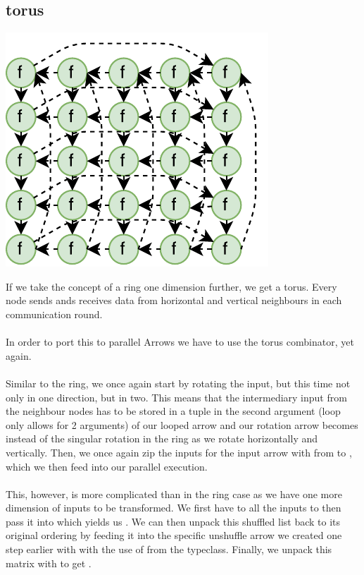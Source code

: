 \subsection{torus}
\begin{center}
	\includegraphics[scale=0.75]{images/torus}
\end{center}
If we take the concept of a ring one dimension further, we get a torus. Every node sends ands receives data from horizontal and vertical neighbours in each communication round.
\\\\
In order to port this to parallel Arrows we have to use the torus combinator, yet again.
\\\\
Similar to the ring, we once again start by rotating the input, but this time not only in one direction, but in two. This means that the intermediary input from the neighbour nodes has to be stored in a tuple \code{([[fut a]], [[fut b]])} in the second argument (loop only allows for 2 arguments) of our looped arrow  and our rotation arrow becomes  instead of the singular rotation in the ring as we rotate \code{[[fut a]]} horizontally and \code{[[fut b]]} vertically. Then, we once again zip the inputs for the input arrow with  from \code{([[c]], ([[fut a]], [[fut b]]))} to , which we then feed into our parallel execution.
\\\\
This, however, is more complicated than in the ring case as we have one more dimension of inputs to be transformed. We first have to  all the inputs to then pass it into  which yields us . We can then unpack this shuffled list back to its original ordering by feeding it into the specific unshuffle arrow we created one step earlier with  with the use of  from the  typeclass. Finally, we unpack this matrix \code{[[[(d, fut a, fut b)]]} with  to get  \code{([[d]], ([[fut a]], [[fut b]]))}.
